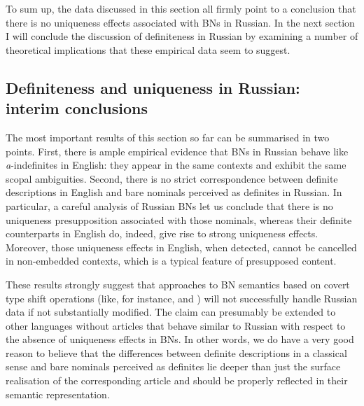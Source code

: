 \documentclass[output=paper,colorlinks,citecolor=brown]{langscibook}
\begin{document}
To sum up, the data discussed in this section all firmly point to a conclusion that there is no uniqueness effects associated with BNs in Russian. In the next section I will conclude the discussion of definiteness in Russian by examining a number of theoretical implications that these empirical data seem to suggest.  





\subsection{Definiteness and uniqueness in Russian: interim conclusions} \label{interimconclusions}

The most important results of this section so far can be summarised in two points. First, there is ample empirical evidence that BNs in Russian behave like \textit{a}-indefinites in English: they appear in the same contexts and exhibit the same scopal ambiguities. Second, there is no strict correspondence between definite descriptions in English and bare nominals perceived as definites in Russian. In particular, a careful analysis of Russian BNs let us conclude that there is no uniqueness presupposition associated with those nominals, whereas their definite counterparts in English do, indeed, give rise to strong uniqueness effects. Moreover, those uniqueness effects in English, when detected, cannot be cancelled in non-embedded contexts, which is a typical feature of presupposed content. 

These results strongly suggest that approaches to BN semantics based on covert type shift operations (like, for instance, \citealt{chierchia98} and \citealt{dayal04}) will not successfully handle Russian data if not substantially modified. The claim can presumably be extended to other languages without articles that behave similar to Russian with respect to the absence of uniqueness effects in BNs.  In other words, we do have a very good reason to believe that the differences between definite descriptions in a classical sense and bare nominals perceived as definites lie deeper than just the surface realisation of the corresponding article and should be properly reflected in their semantic representation. 
\end{document}

